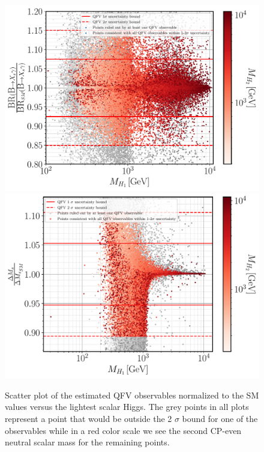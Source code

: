 \documentclass[10pt]{book}
\renewcommand{\(}{\left(}
\renewcommand{\)}{\right)}
\renewcommand{\[}{\left[}
\renewcommand{\]}{\right]}
\begin{document}
\begin{figure}[H]
\centering
\includegraphics[width=.49\textwidth]{Images/3HDM/Reds/Xsgamma_H1_H2.pdf}
\includegraphics[width=.49\textwidth]{Images/3HDM/Reds/DeltaMs_H1_H2.pdf}
	\caption{ Scatter plot of the estimated QFV observables normalized to the SM values versus the lightest scalar Higgs. The grey points in all plots represent a point that would be outside the 2 $\sigma$ bound for one of the observables while in a red color scale we see the second CP-even neutral scalar mass for the remaining points. %
	}
	\label{fig:3HDM_Flavour}
\end{figure}


\end{document}

